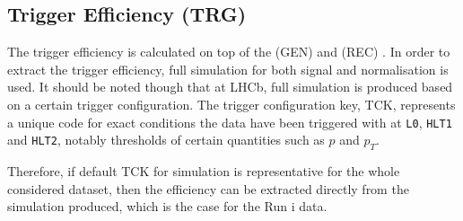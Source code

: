 %
%		


\subsection{Trigger Efficiency (TRG)}
\label{trigef}
 The trigger efficiency is calculated on top of the (GEN) and (REC) \DIFdelbegin {}\DIFdelend \DIFaddbegin {}\DIFaddend . In order to extract the trigger efficiency, full simulation for both signal and normalisation is used. It should be noted though that at \gls{LHCb}, full simulation is produced based on a certain trigger configuration. The trigger configuration key, TCK, represents a unique code for exact conditions the data have been triggered with at \texttt{L0}, \texttt{HLT1} and \texttt{HLT2}, notably thresholds of certain quantities such as $p$ and $p_{T}$. 

Therefore, if \DIFaddbegin {}\DIFaddend default TCK for simulation is representative for the whole considered dataset, then the efficiency can be extracted directly from the simulation produced, which is the case for the Run \Rn{1} data.


